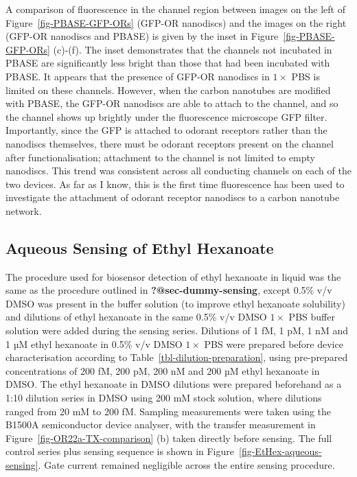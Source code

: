 \documentclass[
  a4paper,
]{scrbook}
\begin{document}
A comparison of fluorescence in the channel region between images on the
left of Figure~\ref{fig-PBASE-GFP-ORs} (GFP-OR nanodiscs) and the images
on the right (GFP-OR nanodiscs and PBASE) is given by the inset in
Figure~\ref{fig-PBASE-GFP-ORs} (c)-(f). The inset demonstrates that the
channels not incubated in PBASE are significantly less bright than those
that had been incubated with PBASE. It appears that the presence of
GFP-OR nanodiscs in \(1 \times\) PBS is limited on these channels.
However, when the carbon nanotubes are modified with PBASE, the GFP-OR
nanodiscs are able to attach to the channel, and so the channel shows up
brightly under the fluorescence microscope GFP filter. Importantly,
since the GFP is attached to odorant receptors rather than the nanodiscs
themselves, there must be odorant receptors present on the channel after
functionalisation; attachment to the channel is not limited to empty
nanodiscs. This trend was consistent across all conducting channels on
each of the two devices. As far as I know, this is the first time
fluorescence has been used to investigate the attachment of odorant
receptor nanodiscs to a carbon nanotube network.

\hypertarget{sec-EtHex-aqueous-sensing}{%
\subsection{Aqueous Sensing of Ethyl
Hexanoate}\label{sec-EtHex-aqueous-sensing}}

The procedure used for biosensor detection of ethyl hexanoate in liquid
was the same as the procedure outlined in \textbf{?@sec-dummy-sensing},
except 0.5\% v/v DMSO was present in the buffer solution (to improve
ethyl hexanoate solubility) and dilutions of ethyl hexanoate in the same
0.5\% v/v DMSO \(1 \times\) PBS buffer solution were added during the
sensing series. Dilutions of 1 fM, 1 pM, 1 nM and 1 µM ethyl hexanoate
in 0.5\% v/v DMSO \(1 \times\) PBS were prepared before device
characterisation according to Table~\ref{tbl-dilution-preparation},
using pre-prepared concentrations of 200 fM, 200 pM, 200 nM and 200 µM
ethyl hexanoate in DMSO. The ethyl hexanoate in DMSO dilutions were
prepared beforehand as a 1:10 dilution series in DMSO using 200 mM stock
solution, where dilutions ranged from 20 mM to 200 fM. Sampling
measurements were taken using the B1500A semiconductor device analyser,
with the transfer measurement in Figure~\ref{fig-OR22a-TX-comparison}
(b) taken directly before sensing. The full control series plus sensing
sequence is shown in Figure~\ref{fig-EtHex-aqueous-sensing}. Gate
current remained negligible across the entire sensing procedure.
\end{document}
